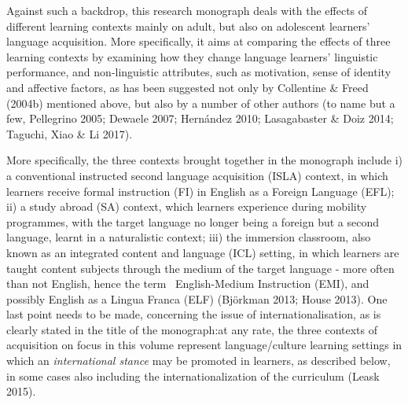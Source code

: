 \begin{styleStandard}
Against such a backdrop, this research monograph deals with the effects of different learning contexts mainly on adult, but also on adolescent learners’ language acquisition. More specifically, it aims at comparing the effects of three learning contexts by examining how they change language learners’ linguistic performance, and non-linguistic attributes, such as motivation, sense of identity and affective factors, as has been suggested not only by Collentine \& Freed (2004b) mentioned above, but also by a number of other authors (to name but a few, Pellegrino 2005; Dewaele 2007; Hernández 2010; Lasagabaster \& Doiz 2014; Taguchi, Xiao \& Li 2017). 
\end{styleStandard}

\begin{styleStandard}
More specifically, the three contexts brought together in the monograph include i) a conventional instructed second language acquisition (ISLA) context, in which learners receive formal instruction (FI) in English as a Foreign Language (EFL); ii) a study abroad (SA) context, which learners experience during mobility programmes, with the target language no longer being a foreign but a second language, learnt in a naturalistic context; iii) the immersion classroom, also known as an integrated content and language (ICL) setting, in which learners are taught content subjects through the medium of the target language - more often than not English, hence the term \ English-Medium Instruction (EMI), and possibly English as a Lingua Franca (ELF) (Björkman 2013; House 2013). One last point needs to be made, concerning the issue of internationalisation, as is clearly stated in the title of the monograph:at any rate, the three contexts of acquisition on focus in this volume represent language/culture learning settings in which an \textit{international stance} may be promoted in learners, as described below, in some cases also including the internationalization of the curriculum (Leask 2015). 
\end{styleStandard}

